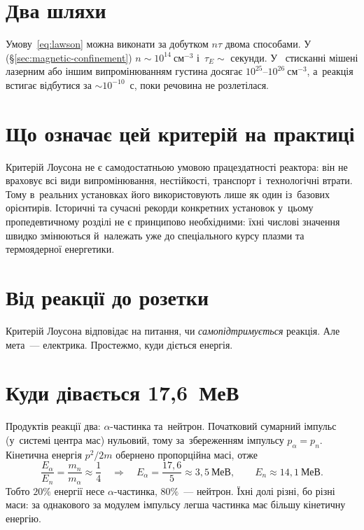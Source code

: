 \section{Два шляхи}



Умову~\eqref{eq:lawson} можна виконати за добутком $n\tau$ двома способами.
У~ (§\ref{sec:magnetic-confinement})
$n\sim10^{14}~\mathrm{см}^{-3}$ і~$\tau_E\sim$ секунди. У~ стисканні
мішені лазерним або іншим випромінюванням густина досягає
$10^{25}$--$10^{26}~\mathrm{см}^{-3}$, а~реакція встигає відбутися за $\sim10^{-10}$~с,
поки речовина не розлетілася.



\section{Що означає цей критерій на практиці}



Критерій Лоусона не є самодостатньою умовою працездатності реактора: він не враховує всі
види випромінювання, нестійкості, транспорт і~технологічні втрати. Тому в~реальних
установках його використовують лише як один із~базових орієнтирів. Історичні та сучасні
рекорди конкретних установок у~цьому пропедевтичному розділі не є принципово необхідними:
їхні числові значення швидко змінюються й~належать уже до спеціального курсу плазми та
термоядерної енергетики.



\section{Від реакції до розетки}



Критерій Лоусона відповідає на питання, чи \emph{самопідтримується} реакція. Але мета~---
електрика. Простежмо, куди діється енергія.



\section{Куди дівається 17,6~МеВ}



Продуктів реакції два: $\alpha$-частинка та~нейтрон. Початковий сумарний імпульс
(у~системі центра мас) нульовий, тому за~збереженням імпульсу $p_\alpha=p_n$. Кінетична
енергія $p^2/2m$ обернено пропорційна масі, отже
\begin{equation*}
	\frac{E_\alpha}{E_n}=\frac{m_n}{m_\alpha}\approx\frac14
	\quad\Rightarrow\quad
	E_\alpha=\frac{17{,}6}{5}\approx3{,}5~\text{МеВ},\qquad E_n\approx14{,}1~\text{МеВ}.
\end{equation*}
Тобто $20\%$ енергії несе $\alpha$-частинка, $80\%$~--- нейтрон. Їхні долі різні, бо різні
маси: за однакового за модулем імпульсу легша частинка має більшу кінетичну енергію.

